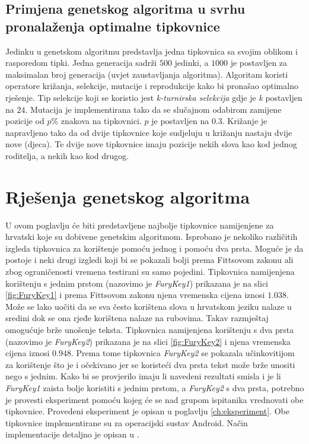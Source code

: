 \documentclass[times, utf8, zavrsni, numeric]{fer}
\begin{document}
\subsection{Primjena genetskog algoritma u svrhu pronalaženja optimalne tipkovnice}
Jedinku u genetskom algoritmu predstavlja jedna tipkovnica sa svojim oblikom i rasporedom tipki. Jedna generacija sadrži $500$ jedinki, a $1000$ je postavljen za maksimalan broj generacija (uvjet zaustavljanja algoritma). Algoritam koristi operatore križanja, selekcije, mutacije i reprodukcije kako bi pronašao optimalno rješenje. Tip selekcije koji se koristio jest \emph{k-turnirska selekcija} gdje je \emph{k} postavljen na $24$. Mutacija je implementirana tako da se slučajnom odabirom zamijene pozicije od $p\%$ znakova na tipkovnici. $p$ je postavljen na $0.3$. Križanje je napravljeno tako da od dvije tipkovnice koje sudjeluju u križanju nastaju dvije nove (djeca). Te dvije nove tipkovnice imaju pozicije nekih slova kao kod jednog roditelja, a nekih kao kod drugog.

\section{Rješenja genetskog algoritma}
U ovom poglavlju će biti predstavljene najbolje tipkovnice namijenjene za hrvatski koje su dobivene genetskim algoritmom. Isprobano je nekoliko različitih izgleda  tipkovnica za korištenje pomoću jednog i pomoću dva prsta. Moguće je da postoje i neki drugi izgledi koji bi se pokazali bolji prema Fittsovom zakonu ali zbog ograničenosti vremena testirani su samo pojedini. Tipkovnica namijenjena korištenju s jednim prstom (nazovimo je \emph{FuryKey1}) prikazana je na slici \ref{fig:FuryKey1} i prema Fittsovom zakonu njena vremenska cijena iznosi $1.038$. Može se lako uočiti da se sva često korištena slova u hrvatskom jeziku nalaze u sredini dok se ona rjeđe korištena nalaze na rubovima. Takav razmještaj omogućuje brže unošenje teksta. Tipkovnica namijenjena korištenju s dva prsta (nazovimo je \emph{FuryKey2}) prikazana je na slici \ref{fig:FuryKey2} i njena vremenska cijena iznosi $0.948$. Prema tome tipkovnica \emph{FuryKey2} se pokazala učinkovitijom za korištenje što je i očekivano jer se koristeći dva prsta tekst može brže unositi nego s jednim. Kako bi se provjerilo imaju li navedeni rezultati smisla i je li \emph{FuryKey1} zaista bolje koristiti s jednim prstom, a \emph{FuryKey2} s dva prsta, potrebno je provesti eksperiment pomoću kojeg će se nad grupom ispitanika vrednovati obe tipkovnice. Provedeni eksperiment je opisan u poglavlju \ref{ch:eksperiment}. Obe tipkovnice implementirane su za operacijski sustav Android. Način implementacije detaljno je opisan u \cite{android_keyboard}.
\end{document}
